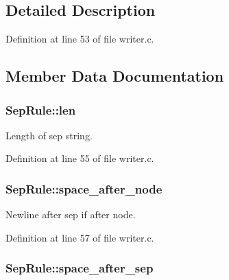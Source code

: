 \subsection{Detailed Description}


Definition at line 53 of file writer.\+c.



\subsection{Member Data Documentation}
\subsubsection[{\texorpdfstring{len}{len}}]{ Sep\+Rule\+::len}\hypertarget{struct_sep_rule_aa58a34eb7afeaca8a25e94a9f0124e79}{}\label{struct_sep_rule_aa58a34eb7afeaca8a25e94a9f0124e79}


Length of sep string. 



Definition at line 55 of file writer.\+c.

\subsubsection[{\texorpdfstring{space\+\_\+after\+\_\+node}{space_after_node}}]{ Sep\+Rule\+::space\+\_\+after\+\_\+node}\hypertarget{struct_sep_rule_a370e32e8e0ce10c53bb35213206160d7}{}\label{struct_sep_rule_a370e32e8e0ce10c53bb35213206160d7}


Newline after sep if after node. 



Definition at line 57 of file writer.\+c.

\subsubsection[{\texorpdfstring{space\+\_\+after\+\_\+sep}{space_after_sep}}]{ Sep\+Rule\+::space\+\_\+after\+\_\+sep}\hypertarget{struct_sep_rule_a01139ef275673bd6a9ee8eb17dc670cc}{}\label{struct_sep_rule_a01139ef275673bd6a9ee8eb17dc670cc}


